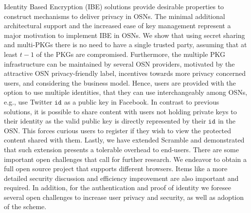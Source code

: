 \documentclass[journal]{IEEEtran}
\newcommand{\id}[1]{\ensuremath{\mathtt{id}_{#1}}}
\begin{document}
Identity Based Encryption (IBE) solutions provide desirable properties to construct mechanisms to deliver privacy in OSNs. The minimal
additional architectural support and the increased ease of key management represent a major motivation to implement IBE in OSNs. We show that using secret sharing and multi-PKGs there is no need to have a single trusted party, assuming that at least $t-1$ of the PKGs are compromised. 
Furthermore, the multiple PKG infrastructure can be maintained by several OSN providers, motivated by the attractive OSN privacy-friendly label, incentives towards more privacy concerned users, and considering the business model. 
Hence, users are provided with the option to use multiple identities, that they can use interchangeably among OSNs, e.g., use Twitter \id{} as a public key in Facebook. 
In contrast to previous solutions, it is possible to share content with users not holding private keys to their identity as the valid public key is directly represented by their \id{} in the OSN. This forces curious users to register if they wish to view the protected content shared with them.
Lastly, we have extended Scramble and demonstrated that such extension presents a tolerable overhead to end-users. 
There are some important open challenges that call for further research. We endeavor to obtain a full open source project that supports different browsers. Items like a more detailed security discussion and efficiency improvement are also important and required. In addition, for the authentication and proof of identity we foresee several open challenges to increase user privacy and security, as well as adoption of the scheme.


%
%
\end{document}
